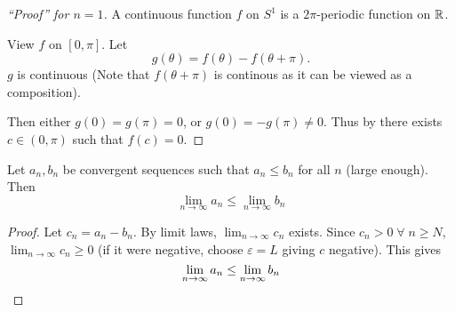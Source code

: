 \begin{proof}[``Proof'' for $n = 1$]
    A continuous function $f$ on $S^{1}$ is a $2\pi$-periodic function on $\mathbb{R}$.
    
    View $f$ on $[0, \pi]$. Let \[
        g(\theta) = f(\theta) - f(\theta + \pi).
    \] $g$ is continuous (Note that $f(\theta + \pi)$ is continous as it can be viewed as a composition).

    Then either $g(0) = g(\pi) = 0$, or $g(0) = -g(\pi) \neq 0$. Thus by  there exists $c \in (0, \pi)$ such that $f(c) = 0$.
\end{proof}

\begin{lem} \label{thm:sequence:comparison}
    Let $a_{n}, b_{n}$ be convergent sequences such that $a_{n} \leq b_{n}$ for all $n$ (large enough). Then \[
        \lim_{n \to \infty} a_{n} \leq \lim_{n \to \infty} b_{n}
    \]
\end{lem}
\begin{proof}
    Let $c_{n} = a_{n} - b_{n}$. By limit laws, $\lim_{n \to \infty} c_{n}$ exists. Since $c_{n} > 0 \;\forall\; n \geq N$, $\lim_{n \to \infty} c_{n} \geq 0$ (if it were negative, choose $\varepsilon = L$ giving $c$ negative). This gives \[
        \lim_{n \to \infty} a_{n} \leq \lim_{n \to \infty} b_{n} \qedhere
    \]
\end{proof}
